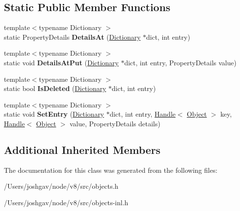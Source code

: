 \subsection*{Static Public Member Functions}
\begin{DoxyCompactItemize}
\item 
{\footnotesize template$<$typename Dictionary $>$ }\\static Property\+Details {\bfseries Details\+At} (\hyperlink{classv8_1_1internal_1_1_dictionary}{Dictionary} $\ast$dict, int entry)\hypertarget{classv8_1_1internal_1_1_base_dictionary_shape_a87796a441fc2e72201a9309a92dda863}{}\label{classv8_1_1internal_1_1_base_dictionary_shape_a87796a441fc2e72201a9309a92dda863}

\item 
{\footnotesize template$<$typename Dictionary $>$ }\\static void {\bfseries Details\+At\+Put} (\hyperlink{classv8_1_1internal_1_1_dictionary}{Dictionary} $\ast$dict, int entry, Property\+Details value)\hypertarget{classv8_1_1internal_1_1_base_dictionary_shape_acb982aea641bc5aadae4537d4a44866e}{}\label{classv8_1_1internal_1_1_base_dictionary_shape_acb982aea641bc5aadae4537d4a44866e}

\item 
{\footnotesize template$<$typename Dictionary $>$ }\\static bool {\bfseries Is\+Deleted} (\hyperlink{classv8_1_1internal_1_1_dictionary}{Dictionary} $\ast$dict, int entry)\hypertarget{classv8_1_1internal_1_1_base_dictionary_shape_a3d0595e62b6f822d3a1ce990ce6bfefd}{}\label{classv8_1_1internal_1_1_base_dictionary_shape_a3d0595e62b6f822d3a1ce990ce6bfefd}

\item 
{\footnotesize template$<$typename Dictionary $>$ }\\static void {\bfseries Set\+Entry} (\hyperlink{classv8_1_1internal_1_1_dictionary}{Dictionary} $\ast$dict, int entry, \hyperlink{classv8_1_1internal_1_1_handle}{Handle}$<$ \hyperlink{classv8_1_1internal_1_1_object}{Object} $>$ key, \hyperlink{classv8_1_1internal_1_1_handle}{Handle}$<$ \hyperlink{classv8_1_1internal_1_1_object}{Object} $>$ value, Property\+Details details)\hypertarget{classv8_1_1internal_1_1_base_dictionary_shape_ae6e31046647e5fe495a813b4db4e5633}{}\label{classv8_1_1internal_1_1_base_dictionary_shape_ae6e31046647e5fe495a813b4db4e5633}

\end{DoxyCompactItemize}
\subsection*{Additional Inherited Members}


The documentation for this class was generated from the following files\+:\begin{DoxyCompactItemize}
\item 
/\+Users/joshgav/node/v8/src/objects.\+h\item 
/\+Users/joshgav/node/v8/src/objects-\/inl.\+h\end{DoxyCompactItemize}
